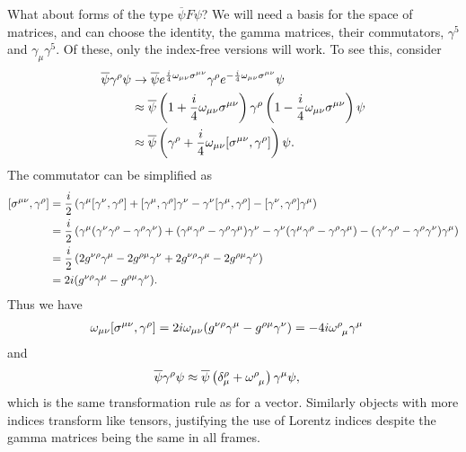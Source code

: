 What about forms of the type $\overline{\psi}F\psi$? We will need a basis for the space of matrices, and can choose the identity, the gamma matrices, their commutators, $\gamma^{5}$ and $\gamma_{\mu}\gamma^{5}$. Of these, only the index-free versions will work. To see this, consider
\begin{align*}
	\overline{\psi}\gamma^{\rho}\psi &\to \overline{\psi}e^{\frac{i}{4}\omega_{\mu\nu}\sigma^{\mu\nu}}\gamma^{\rho}e^{-\frac{i}{4}\omega_{\mu\nu}\sigma^{\mu\nu}}\psi \\
	                                &\approx \overline{\psi}\left(1 + \frac{i}{4}\omega_{\mu\nu}\sigma^{\mu\nu}\right)\gamma^{\rho}\left(1 - \frac{i}{4}\omega_{\mu\nu}\sigma^{\mu\nu}\right)\psi \\
	                                &\approx \overline{\psi}\left(\gamma^{\rho} + \frac{i}{4}\omega_{\mu\nu}\comm{\sigma^{\mu\nu}}{\gamma^{\rho}}\right)\psi.
\end{align*}
The commutator can be simplified as
\begin{align*}
	\comm{\sigma^{\mu\nu}}{\gamma^{\rho}} &= \frac{i}{2}\left(\gamma^{\mu}\comm{\gamma^{\nu}}{\gamma^{\rho}} + \comm{\gamma^{\mu}}{\gamma^{\rho}}\gamma^{\nu} - \gamma^{\nu}\comm{\gamma^{\mu}}{\gamma^{\rho}} - \comm{\gamma^{\nu}}{\gamma^{\rho}}\gamma^{\mu}\right) \\
	                                         &= \frac{i}{2}\left(\gamma^{\mu}(\gamma^{\nu}\gamma^{\rho} - \gamma^{\rho}\gamma^{\nu}) + (\gamma^{\mu}\gamma^{\rho} - \gamma^{\rho}\gamma^{\mu})\gamma^{\nu} - \gamma^{\nu}(\gamma^{\mu}\gamma^{\rho} - \gamma^{\rho}\gamma^{\mu}) - (\gamma^{\nu}\gamma^{\rho} - \gamma^{\rho}\gamma^{\nu})\gamma^{\mu}\right) \\
	                                         &= \frac{i}{2}\left(2g^{\nu\rho}\gamma^{\mu} - 2g^{\rho\mu}\gamma^{\nu} + 2g^{\nu\rho}\gamma^{\mu} - 2g^{\rho\mu}\gamma^{\nu}\right) \\
	                                         &= 2i(g^{\nu\rho}\gamma^{\mu} - g^{\rho\mu}\gamma^{\nu}).
\end{align*}
Thus we have
\begin{align*}
	\omega_{\mu\nu}\comm{\sigma^{\mu\nu}}{\gamma^{\rho}} &= 2i\omega_{\mu\nu}(g^{\nu\rho}\gamma^{\mu} - g^{\rho\mu}\gamma^{\nu}) = -4i\tensor{\omega}{^{\rho}_{\mu}}\gamma^{\mu}
\end{align*}
and
\begin{align*}
	\overline{\psi}\gamma^{\rho}\psi &\approx \overline{\psi}\left(\kdelta{\rho}{\mu} + \tensor{\omega}{^{\rho}_{\mu}}\right)\gamma^{\mu}\psi,
\end{align*}
which is the same transformation rule as for a vector. Similarly objects with more indices transform like tensors, justifying the use of Lorentz indices despite the gamma matrices being the same in all frames.

